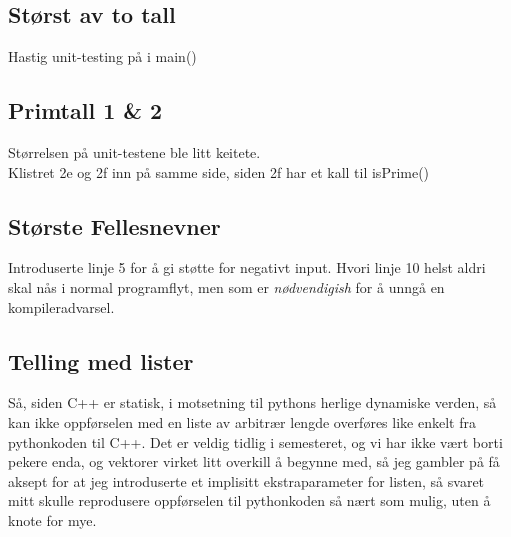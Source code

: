 \documentclass{article}
\begin{document}
\newpage
\subsection{Størst av to tall}

Hastig unit-testing på i main()
\newpage
\subsection{Primtall 1 \& 2}

Størrelsen på unit-testene ble litt keitete.\\
Klistret 2e og 2f inn på samme side, siden 2f har et kall til isPrime()
\newpage
\subsection{Største Fellesnevner}


Introduserte linje 5 for å gi støtte for negativt input.
Hvori linje 10 helst aldri skal nås i normal programflyt, men som er \emph{nødvendigish} for å unngå en
kompileradvarsel.

\newpage
\subsection{Telling med lister}


Så, siden C++ er statisk, i motsetning til pythons herlige dynamiske verden, så kan ikke oppførselen med en liste av arbitrær lengde overføres like enkelt fra pythonkoden til C++.
Det er veldig tidlig i semesteret, og vi har ikke vært borti pekere enda, og vektorer virket litt overkill å begynne med, så jeg gambler på få aksept for at jeg introduserte et implisitt ekstraparameter for listen, så svaret mitt skulle reprodusere oppførselen til pythonkoden så nært som mulig, uten å knote for mye.
\end{document}
